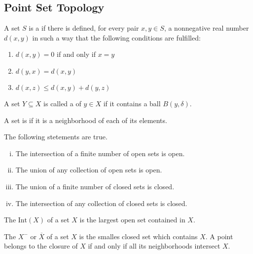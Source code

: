 \subsection{Point Set Topology}

\begin{definition}
    A set $S$ is a  if there is defined, for every pair $x,y \in S$,
    a nonnegative real number $d(x,y)$ in such a way that the following conditions
    are fulfilled:
    \begin{enumerate}
        \item $d(x,y) = 0$ if and only if $x=y$
        \item $d(y,x) = d(x,y)$
        \item $d(x,z) \leq d(x,y) + d(y,z)$
    \end{enumerate}
\end{definition}

\begin{definition}[Neighborhood]
    A set $Y \subseteq X$ is called a  of $y \in X$ if it contains a ball
    $B(y,\delta)$.
\end{definition}

\begin{definition}
    A set is  if it is a neighborhood of each of its elements.
\end{definition}

\begin{theorem}
    The following stetements are true.
    \begin{enumerate}[(i)]
        \item The intersection of a finite number of open sets is open.
        \item The union of any collection of open sets is open.
        \item The union of a finite number of closed sets is closed.
        \item The intersection of any collection of closed sets is closed.
    \end{enumerate}
\end{theorem}

\begin{definition}[Interior]
    The  $\text{Int} (X)$ of a set $X$ is the largest open set contained in $X$.
\end{definition}

\begin{definition}[Closure]
    The  $X^-$ or $\overline{X}$ of a set $X$ is the smalles closed set which
    contains $X$. A point belongs to the closure of $X$ if and only if all its
    neighborhoods intersect $X$.
\end{definition}

